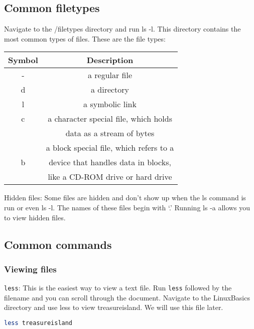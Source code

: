 \documentclass[11pt,a4paper]{article}
\begin{document}
\subsection*{Common filetypes}

\indent\indent Navigate to the /filetypes directory and run ls -l. This directory contains the most common types of files. These are the file types:

\begin{center}
\begin{tabular}{|c|c|}
\hline
Symbol & Description \\
\hline
\hline
- & a regular file\\
\hline
d & a directory\\
\hline
l & a symbolic link\\
\hline
c & a character special file, which holds \\
  & data as a stream of bytes\\
  \hline
  & a block special file, which refers to a \\
b & device that handles data in blocks, \\
  & like a CD-ROM drive or hard drive\\
  \hline
\end{tabular}
\end{center}

Hidden files: Some files are hidden and don't show up when the ls command is run or even ls -l. The names of these files begin with `.' Running ls -a allows you to view hidden files.


\subsection*{Common commands}

\subsubsection*{Viewing files}

\indent\indent \verb|less|: This is the easiest way to view a text file. Run \verb|less| followed by the filename and you can scroll through the document. Navigate to the LinuxBasics directory and use less to view treasureisland. We will use this file later.

\begin{lstlisting}[basicstyle=\ttfamily, backgroundcolor = \color{lightgray}, language = bash, xleftmargin = 0cm, framexleftmargin = 1em]
less treasureisland
\end{lstlisting}
\end{document}
